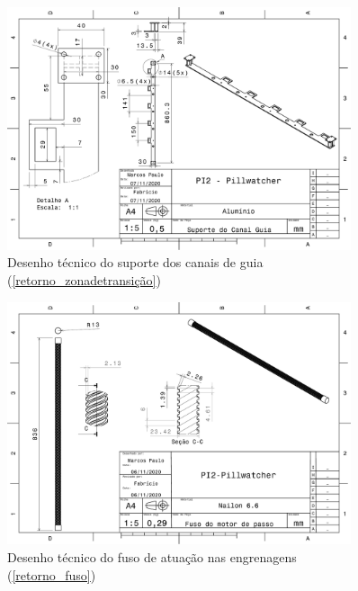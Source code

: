 \begin{apendicesenv}
\begin{figure}[H]
    \centering
    \includegraphics[width=0.9\textwidth]{figuras/estrutura/Desenhos/Suporte_Canal_Guia.pdf}
    \caption{Desenho técnico do suporte dos canais de guia (\ref{retorno_zonadetransição})}
    \label{fig:supp_canal}
\end{figure}

\begin{figure}[H]
    \centering
    \includegraphics[width=0.9\textwidth]{figuras/estrutura/Desenhos/Fuso_Engrenagens.pdf}
    \caption{Desenho técnico do fuso de atuação nas engrenagens (\ref{retorno_fuso})}
    \label{fig:fuso}
\end{figure}


\end{apendicesenv}
